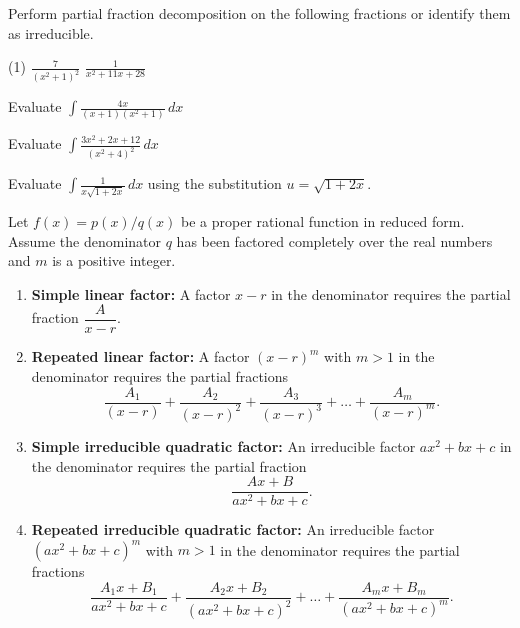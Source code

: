 \documentclass[../mathNotesPreamble]{subfiles}
\begin{document}
  \begin{ex*}
    Perform partial fraction decomposition on the following fractions or identify them as irreducible.
  \end{ex*}
  \begin{tasks}[after-item-skip=\stretch{1}, label=, item-indent=0mm](1)
    \task $\displaystyle \frac{7}{(x^2+1)^2}$
    \task $\displaystyle \frac{1}{x^2+11x+28}$
  \end{tasks}
  \pagebreak

  \begin{ex*}
    Evaluate $\displaystyle \int \frac{4x}{(x+1)(x^2+1)}\,dx$
  \end{ex*}
  \pagebreak

  \begin{ex*}
    Evaluate $\displaystyle \int \frac{3x^2+2x+12}{(x^2+4)^2}\,dx$
  \end{ex*}
  \pagebreak

  \begin{ex*}
    Evaluate $\displaystyle \int \frac{1}{x\sqrt{1+2x}}\,dx$ using the substitution $u=\sqrt{1+2x}$.
  \end{ex*}
  \pagebreak

  \begin{thmBox*}
    Let $f(x)=p(x)/q(x)$ be a proper rational function in reduced form. Assume the denominator $q$ has been factored completely over the real numbers and $m$ is a positive integer.
    \begin{enumerate}
      \item \textbf{Simple linear factor:} A factor $x-r$ in the denominator requires the partial fraction $\dfrac{A}{x-r}$.
      \item \textbf{Repeated linear factor: } A factor $(x-r)^m$ with $m>1$ in the denominator requires the partial fractions
        \[\frac{A_1}{(x-r)}+\frac{A_2}{(x-r)^2}+\frac{A_3}{(x-r)^3}+\dots+\frac{A_m}{(x-r)^m}.\]
      \item \textbf{Simple irreducible quadratic factor: } An irreducible factor $ax^2+bx+c$ in the denominator requires the partial fraction 
        \[\frac{Ax+B}{ax^2+bx+c}.\]
      \item \textbf{Repeated irreducible quadratic factor:} An irreducible factor $(ax^2+bx+c)^m$ with $m>1$ in the denominator requires the partial fractions
        \[\frac{A_1x+B_1}{ax^2+bx+c}+\frac{A_2x+B_2}{(ax^2+bx+c)^2}+\dots+\frac{A_mx+B_m}{(ax^2+bx+c)^m}.\]
    \end{enumerate}
  \end{thmBox*}
  \pagebreak
\end{document}
